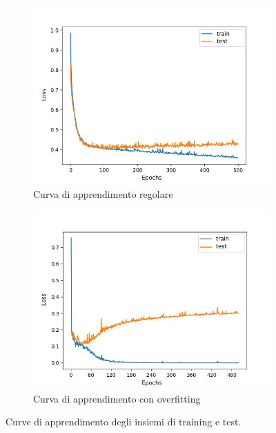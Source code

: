 \documentclass[12pt, twoside, letterpaper]{report}
\begin{document}
				\begin{figure}
				\begin{subfigure}[]{.5\textwidth}
					\centering
					\includegraphics[width=\linewidth]{learning_curve.png}
					\caption{Curva di apprendimento regolare}
					\label{fig:learning_curve}
				\end{subfigure}
				\hfill
				\begin{subfigure}[]{.5\textwidth}
					\centering
					\includegraphics[width=\linewidth]{overfitting.png}
					\caption{Curva di apprendimento con overfitting}
					\label{fig:overfitting}
				\end{subfigure}
				
				\caption{Curve di apprendimento degli insiemi di training e test.}
				\label{fig:curve_di_apprendimento}
				\end{figure}
				
\end{document}
